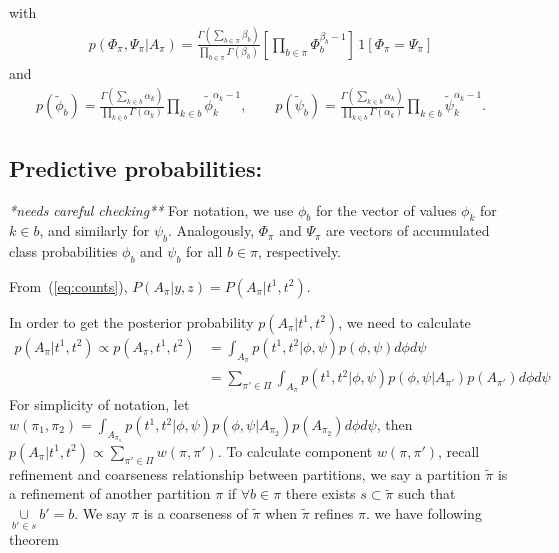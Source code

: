 \documentclass[11pt]{amsart}
\begin{document}
with
\begin{eqnarray*}
p( \Phi_\pi, \Psi_\pi | A_\pi )
= \frac{\Gamma(\sum_{b\in \pi} \beta_b)}{
 \prod_{b \in \pi} \Gamma( \beta_b )} \left[\prod_{b \in \pi} \Phi_b^{\beta_b-1} \right] \,
 1\left[ \Phi_\pi = \Psi_\pi \right]
\end{eqnarray*}
and
\begin{eqnarray*}
p( \tilde \phi_b ) =
\frac{ \Gamma( \sum_{k\in b} \alpha_k ) }{ \prod_{k\in b} \Gamma(\alpha_k) }
 \prod_{k \in b} \tilde \phi_k^{\alpha_k -1 },
\qquad
p( \tilde \psi_b )
=
\frac{ \Gamma( \sum_{k\in b} \alpha_k ) }{ \prod_{k\in b} \Gamma(\alpha_k) }
\prod_{k \in b} \tilde \psi_k^{\alpha_k -1 }.
\end{eqnarray*}



\subsection{Predictive probabilities:}
{\em **needs careful checking**}
For notation, we use $\phi_b$ for the vector of values $\phi_k$ for $k \in b$,
and similarly for $\psi_b$. Analogously, $\Phi_\pi$ and $\Psi_\pi$
 are vectors of 
accumulated class probabilities $\phi_b$ and $\psi_b$ for all $b \in \pi$,
 respectively. 

From~(\ref{eq:counts}), $P(A_\pi|y,z) = P(A_{\pi}|t^1, t^2)$.



In order to get the posterior probability $p(A_\pi | t^1,t^2)$, we need to calculate 
\[
\begin{split}
p(A_\pi | t^1,t^2)\propto p(A_\pi, t^1,t^2) &= \int_{A_\pi} p(t^1,t^2|\phi,\psi)p(\phi,\psi) d\phi d\psi\\ 
&= \sum_{\pi'\in \Pi}\int_{A_\pi} p(t^1,t^2|\phi,\psi)p(\phi, \psi | A_{\pi'})p(A_{\pi'})d\phi d\psi
\end{split}
\]
For simplicity of notation, let $w(\pi_1, \pi_2) = \int_{A_{\pi_1}} p(t^1,t^2|\phi,\psi)p(\phi, \psi | A_{\pi_2})p(A_{\pi_2})d\phi d\psi$, then 
$p(A_\pi | t^1,t^2)\propto \underset{\pi'\in \Pi}\sum w(\pi, \pi')$. To calculate component $w(\pi, \pi')$, recall refinement and coarseness relationship between partitions, we say a partition $\tilde{\pi}$ is a refinement of another partition $\pi$ if $\forall b \in \pi$ there exists $s \subset \tilde{\pi}$  such that $\underset{b'\in s}\cup b' = b$. We say $\pi$ is a coarseness of $\tilde{\pi}$ when $\tilde{\pi}$ refines $\pi$. we have following theorem
\end{document}
